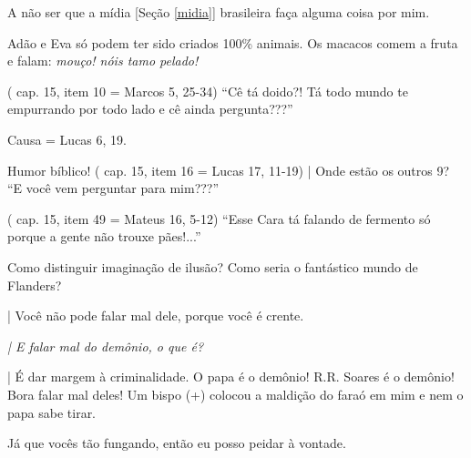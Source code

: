 \documentclass[12pt,a4paper]{article}
\begin{document}
		A n\~ao ser que a m\'idia [Se\c{c}\~ao \ref{midia}] brasileira fa\c{c}a alguma coisa por mim.

		\begin{flushright}
		\end{flushright}

		Ad\~ao e Eva s\'o podem ter sido criados 100\% animais. Os macacos comem a fruta e falam: \emph{mou\c{c}o! n\'ois tamo pelado!}

		\begin{flushright}
		\end{flushright}

		(\cite{genese} cap. 15, item 10 = Marcos 5, 25-34) \textquotedblleft C\^e t\'a doido?! T\'a todo mundo te empurrando por todo lado e c\^e ainda pergunta???\textquotedblright

		Causa = Lucas 6, 19.

		\begin{flushright}
		\end{flushright}

		Humor b\'iblico\cite{x}! (\cite{genese} cap. 15, item 16 = Lucas 17, 11-19) | Onde est\~ao os outros 9? \textquotedblleft E voc\^e vem perguntar para mim???\textquotedblright

		\begin{flushright}
		\end{flushright}

		(\cite{genese} cap. 15, item 49 = Mateus 16, 5-12) \textquotedblleft Esse Cara t\'a falando de fermento s\'o porque a gente n\~ao trouxe p\~aes!...\textquotedblright

		\begin{flushright}
		\end{flushright}

		Como distinguir imagina\c{c}\~ao de ilus\~ao\cite{x}? Como seria o fant\'astico mundo de Flanders?

		| Voc\^e n\~ao pode falar mal dele, porque voc\^e \'e crente.

		\emph{| E falar mal do dem\^onio, o que \'e?}

		| \'E dar margem \`a criminalidade. O papa\cite{x} \'e o dem\^onio! R.R. Soares\cite{x} \'e o dem\^onio! Bora falar mal deles! Um bispo (+) colocou a maldi\c{c}\~ao do fara\'o em mim e nem o papa sabe tirar.

		\begin{flushright}
		\end{flushright}

		J\'a que voc\^es t\~ao fungando, ent\~ao eu posso peidar \`a vontade.
\end{document}
